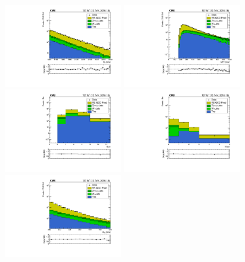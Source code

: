 \begin{figure}[!htbp]
  \begin{center}
    \includegraphics[width=0.46\textwidth]{figs/qcd/rs_data/c_crRSInvertDPhiInclusiveHT1200toInf_h_ht.pdf}
    \includegraphics[width=0.46\textwidth]{figs/qcd/rs_data/c_crRSInvertDPhiInclusiveHT1200toInf_h_met.pdf}
    \includegraphics[width=0.46\textwidth]{figs/qcd/rs_data/c_crRSInvertDPhiInclusiveHT1200toInf_h_nJet30.pdf}
    \includegraphics[width=0.46\textwidth]{figs/qcd/rs_data/c_crRSInvertDPhiInclusiveHT1200toInf_h_nBJet20.pdf}
    \includegraphics[width=0.46\textwidth]{figs/qcd/rs_data/c_crRSInvertDPhiInclusiveHT1200toInf_h_mt2.pdf}

\end{center}
\end{figure}
